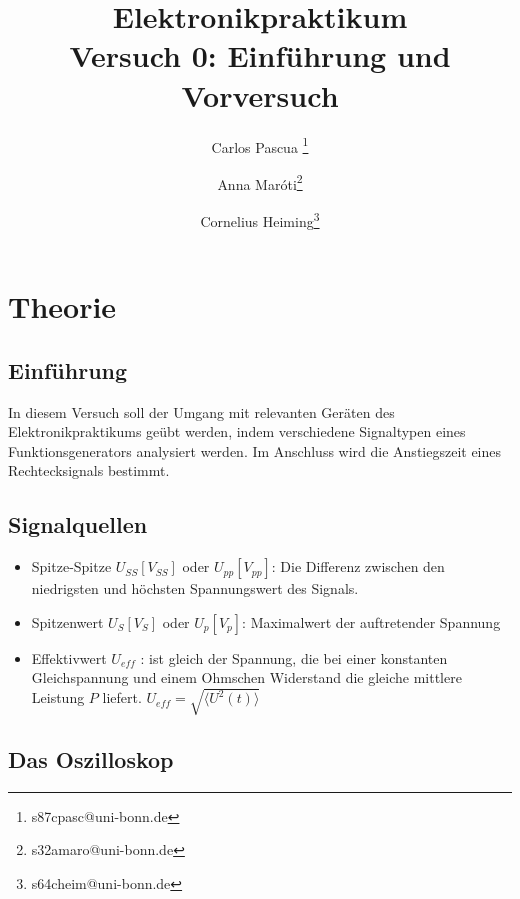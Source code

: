 \documentclass{article}
\begin{document}
    \title{Elektronikpraktikum \\ \textbf{Versuch 0: Einführung und Vorversuch}}
    \author[1]{Carlos Pascua \thanks{s87cpasc@uni-bonn.de}}
    \author[1]{Anna Maróti\thanks{s32amaro@uni-bonn.de}}
    \author[1]{Cornelius Heiming\thanks{s64cheim@uni-bonn.de}}
    \begin{titlepage}
     \maketitle   
    \end{titlepage}
        

\tableofcontents
\newpage
{}

\pagestyle{fancy}
\fancyhead[R]{\thepage}
\fancyhead[L]{\leftmark}

\section{Theorie}

\subsection*{Einführung}
In diesem Versuch soll der Umgang mit  relevanten Geräten des Elektronikpraktikums geübt werden, 
indem verschiedene Signaltypen eines Funktionsgenerators analysiert werden. 
Im Anschluss wird die Anstiegszeit eines Rechtecksignals bestimmt. 


\subsection*{Signalquellen}
\begin{itemize}
    \item Spitze-Spitze $U_{SS} [V_{SS}]$ oder $U_{pp} [V_{pp}]$: Die Differenz zwischen den niedrigsten und höchsten Spannungswert des Signals.
    \item Spitzenwert $U_{S} [V_{S}]$ oder $U_{p} [V_{p}]$: Maximalwert der auftretender Spannung 
    \item Effektivwert $U_{eff}$ : ist gleich der Spannung, die bei einer konstanten Gleichspannung und einem Ohmschen Widerstand die gleiche mittlere Leistung $P$ liefert. $U_{eff}= \sqrt{\langle U^2(t) \rangle}$
\end{itemize}


\subsection{Das Oszilloskop}
\end{document}
